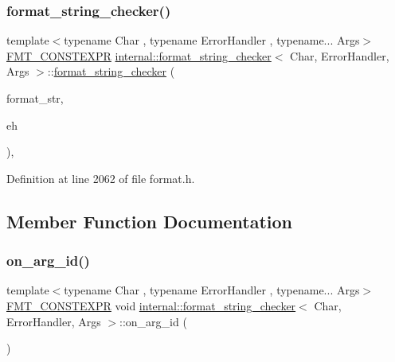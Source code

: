 \subsubsection{\texorpdfstring{format\+\_\+string\+\_\+checker()}{format\_string\_checker()}}
{\footnotesize\ttfamily template$<$typename Char , typename Error\+Handler , typename... Args$>$ \\
\hyperlink{core_8h_a69201cb276383873487bf68b4ef8b4cd}{F\+M\+T\+\_\+\+C\+O\+N\+S\+T\+E\+X\+PR} \hyperlink{classinternal_1_1format__string__checker}{internal\+::format\+\_\+string\+\_\+checker}$<$ Char, Error\+Handler, Args $>$\+::\hyperlink{classinternal_1_1format__string__checker}{format\+\_\+string\+\_\+checker} (\begin{DoxyParamCaption}\item[{\hyperlink{classbasic__string__view}{basic\+\_\+string\+\_\+view}$<$ Char $>$}]{format\+\_\+str,  }\item[{Error\+Handler}]{eh }\end{DoxyParamCaption})\hspace{0.3cm}{\ttfamily [inline]}, {\ttfamily [explicit]}}



Definition at line 2062 of file format.\+h.



\subsection{Member Function Documentation}
\mbox{\label{classinternal_1_1format__string__checker_aa885efcd3d9786997df78121b82b85a2}} 
\subsubsection{\texorpdfstring{on\+\_\+arg\+\_\+id()}{on\_arg\_id()}\hspace{0.1cm}{\footnotesize\ttfamily [1/3]}}
{\footnotesize\ttfamily template$<$typename Char , typename Error\+Handler , typename... Args$>$ \\
\hyperlink{core_8h_a69201cb276383873487bf68b4ef8b4cd}{F\+M\+T\+\_\+\+C\+O\+N\+S\+T\+E\+X\+PR} void \hyperlink{classinternal_1_1format__string__checker}{internal\+::format\+\_\+string\+\_\+checker}$<$ Char, Error\+Handler, Args $>$\+::on\+\_\+arg\+\_\+id (\begin{DoxyParamCaption}{ }\end{DoxyParamCaption})\hspace{0.3cm}{\ttfamily [inline]}}



